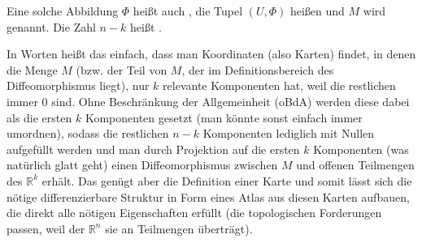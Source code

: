 \documentclass[../H_Analysis_main.tex]{subfiles}
\begin{document}
\begin{defi}
Eine solche Abbildung $\Phi$ heißt auch , die Tupel $(U, \Phi)$ heißen  und $M$ wird  genannt. Die Zahl $n - k$ heißt .
\end{defi}
In Worten heißt das einfach, dass man Koordinaten (also Karten) findet, in denen die Menge $M$ (bzw. der Teil von $M$, der im Definitionsbereich des Diffeomorphismus liegt), nur $k$ relevante Komponenten hat, weil die restlichen immer 0 sind. Ohne Beschränkung der Allgemeinheit (oBdA) werden diese dabei als die ersten $k$ Komponenten gesetzt (man könnte sonst einfach immer umordnen), sodass die restlichen $n - k$ Komponenten lediglich mit Nullen aufgefüllt werden und man durch Projektion auf die ersten $k$ Komponenten (was natürlich glatt geht) einen Diffeomorphismus zwischen $M$ und offenen Teilmengen des $\mathbb{R}^k$ erhält. Das genügt aber die Definition einer Karte und somit lässt sich die nötige differenzierbare Struktur in Form eines Atlas aus diesen Karten aufbauen, die direkt alle nötigen Eigenschaften erfüllt (die topologischen Forderungen passen, weil der $\mathbb{R}^n$ sie an Teilmengen überträgt).

\end{document}
